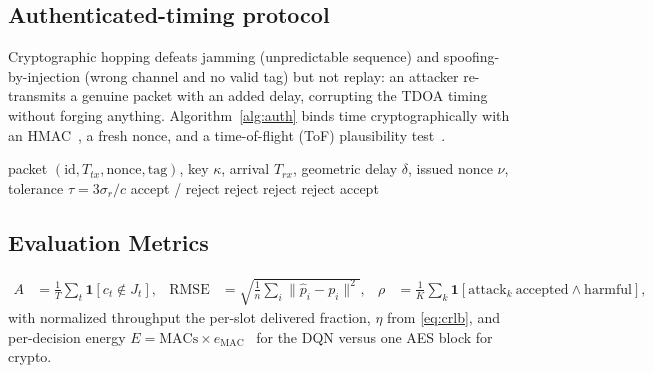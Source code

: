 \documentclass[11pt]{article}
\begin{document}
\subsection{Authenticated-timing protocol}
Cryptographic hopping defeats jamming (unpredictable sequence) and
spoofing-by-injection (wrong channel and no valid tag) but not replay: an
attacker re-transmits a genuine packet with an added delay, corrupting the TDOA
timing without forging anything. Algorithm~\ref{alg:auth} binds time
cryptographically with an HMAC~\cite{ref21}, a fresh nonce, and a
time-of-flight (ToF) plausibility test~\cite{ref23}.

\begin{algorithm}[H]
\caption{Authenticated-timing verification at the drone}\label{alg:auth}
\begin{algorithmic}[1]
\Require packet $(\text{id},T_{tx},\text{nonce},\text{tag})$, key $\kappa$,
arrival $T_{rx}$, geometric delay $\delta$, issued nonce $\nu$, tolerance
$\tau=3\sigma_r/c$
\Ensure accept / reject
      \State \Return reject 
\EndIf
{} \State \Return reject 
\EndIf
{}
      \State \Return reject 
\EndIf
\State \Return accept
\end{algorithmic}
\end{algorithm}

\subsection{Evaluation Metrics}\label{sec:metrics}
\begin{align}
A &= \tfrac1T\textstyle\sum_t \mathbf 1[c_t\notin J_t], &
\mathrm{RMSE} &= \sqrt{\tfrac1n\textstyle\sum_i \lVert \hat p_i - p_i\rVert^2}, &
\rho &= \tfrac1K\textstyle\sum_k \mathbf 1[\text{attack}_k\ \text{accepted}\wedge\text{harmful}],
\end{align}
with normalized throughput the per-slot delivered fraction, $\eta$ from
\eqref{eq:crlb}, and per-decision energy $E=\text{MACs}\times e_{\mathrm{MAC}}$~\cite{ref39}
for the DQN versus one AES block for crypto.

\end{document}
